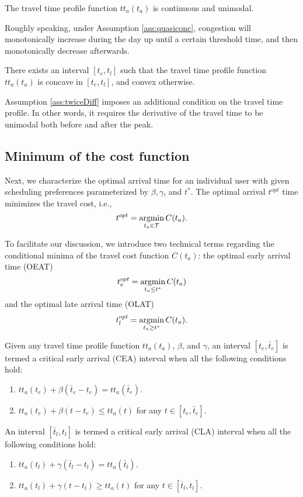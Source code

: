 \begin{assumption}\label{ass:quasiconc}
   The travel time profile function $tt_a(t_a)$ is continuous and unimodal. 
\end{assumption}

Roughly speaking, under Assumption \ref{ass:quasiconc}, congestion will monotonically increase during the day up until a certain threshold time, and then monotonically decrease afterwards. 
 
\begin{assumption}\label{ass:twiceDiff}
  There exists an interval $[t_e, t_l]$ such that the travel time profile function $tt_a(t_a)$ is concave in $[t_e, t_l ]$, and convex otherwise. 
\end{assumption}

Assumption \ref{ass:twiceDiff} imposes an additional condition on the travel time profile. In other words, it requires the derivative of the travel time to be unimodal both before and after the peak.

\subsection{Minimum of the cost function}
\label{sec:cost_minima}

Next, we characterize the optimal arrival time for an individual user with given scheduling preferences parameterized by $\beta, \gamma$, and $t^*$.  The optimal arrival \(t^{opt}\) time minimizes the travel cost, i.e., 
    \begin{equation*}
      t^{opt} = \operatorname*{argmin}_{t_a \in \mathcal{T}}C(t_a).
    \end{equation*} 

To facilitate our discussion, we introduce two technical terms regarding the conditional minima of the travel cost function $C(t_a)$: the optimal early arrival time (OEAT) $$t_e^{opt}  = \operatorname*{argmin}_{t_a \le  t^*}C(t_a)$$ and the optimal late arrival time (OLAT)$$t_l^{opt} =  \operatorname*{argmin}_{t_a \ge  t^*}C(t_a).$$ 

\begin{definition}
    Given any travel time profile function $tt_a(t_a)$, \(\beta\), and \( \gamma\),  an interval $[t_e, \bar t_e]$ is termed a critical early arrival (CEA) interval when all the following conditions hold:
    \begin{enumerate}
        \item $ tt_a(t_e) + \beta (\bar t_e - t_e)   = tt_a(\bar t_e )$.
         \item $ tt_a(t_e)  + \beta (t - t_e ) \le  tt_a(t )$ for any $t \in [t_e, \bar t_e]$.
    \end{enumerate}
    An interval $[\bar t_l, t_l]$ is termed a critical early arrival (CLA) interval when all the following conditions hold:
    \begin{enumerate}
        \item $ tt_a(t_l) + \gamma(\bar t_l - t_l)   = tt_a(\bar t_l )$.
         \item $ tt_a(t_l)  + \gamma  (t - t_l ) \ge  tt_a(t )$ for any $t \in [\bar  t_l, t_l]$.
    \end{enumerate}
    
\end{definition}

